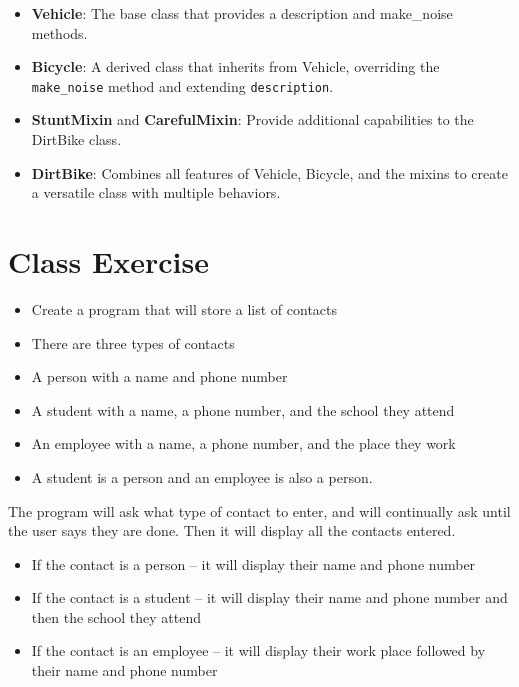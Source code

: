 \documentclass{article}
\begin{document}
\begin{itemize}
    \item \textbf{Vehicle}: The base class that provides a description and make\_noise methods.
    \item \textbf{Bicycle}: A derived class that inherits from Vehicle, overriding the \texttt{make\_noise} method and extending \texttt{description}.
    \item \textbf{StuntMixin} and \textbf{CarefulMixin}: Provide additional capabilities to the DirtBike class.
    \item \textbf{DirtBike}: Combines all features of Vehicle, Bicycle, and the mixins to create a versatile class with multiple behaviors.
\end{itemize}

\newpage 

\section{Class Exercise}
\begin{itemize}
    \item Create a program that will store a list of contacts
    \item There are three types of contacts
    \item A person with a name and phone number
    \item A student with a name, a phone number, and the school they attend
    \item An employee with a name, a phone number, and the place they work
    \item A student is a person and an employee is also a person.
    \end{itemize}
The program will ask what type of contact to enter, and will continually ask until the user says they are done. Then it will display all the contacts entered.
\begin{itemize}
          \item If the contact is a person – it will display their name and phone number
          \item If the contact is a student – it will display their name and phone number and then the
          school they attend
          \item If the contact is an employee – it will display their work place followed by their name and
          phone number 
\end{itemize}
\end{document}

